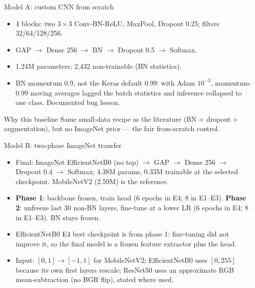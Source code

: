 \documentclass[aspectratio=169]{beamer}
\begin{document}
\begin{frame}{Model A: custom CNN from scratch}
  \begin{itemize}
    \item 4 blocks: two $3\times3$ Conv-BN-ReLU, MaxPool, Dropout 0.25;
          filters 32/64/128/256.
    \item GAP $\to$ Dense 256 $\to$ BN $\to$ Dropout 0.5 $\to$ Softmax.
    \item 1.24M parameters; 2,432 non-trainable (BN statistics).
    \item BN momentum 0.9, not the Keras default 0.99: with Adam $10^{-3}$,
          momentum-0.99 moving averages lagged the batch statistics and
          inference collapsed to one class. Documented bug lesson.
  \end{itemize}
  \begin{block}{Why this baseline}
    Same small-data recipe as the literature (BN + dropout + augmentation),
    but no ImageNet prior --- the fair from-scratch control.
  \end{block}
\end{frame}
\begin{frame}{Model B: two-phase ImageNet transfer}
  \begin{itemize}
    \item Final: ImageNet EfficientNetB0 (no top) $\to$ GAP $\to$ Dense 256
          $\to$ Dropout 0.4 $\to$ Softmax; 4.38M params, 0.33M trainable at
          the selected checkpoint. MobileNetV2 (2.59M) is the reference.
    \item \textbf{Phase 1}: backbone frozen, train head (6 epochs in E4; 8 in
          E1--E3). \textbf{Phase 2}: unfreeze last 30 non-BN layers, fine-tune
          at a lower LR (6 epochs in E4; 8 in E1--E3). BN stays frozen.
    \item EfficientNetB0 E4 best checkpoint is from phase 1: fine-tuning did
          not improve it, so the final model is a frozen feature extractor
          plus the head.
    \item Input: $[0,1]\to[-1,1]$ for MobileNetV2; EfficientNetB0 uses
          $[0,255]$ because its own first layers rescale; ResNet50 uses an
          approximate RGB mean-subtraction (no BGR flip), stated where used.
  \end{itemize}
\end{frame}
\end{document}
